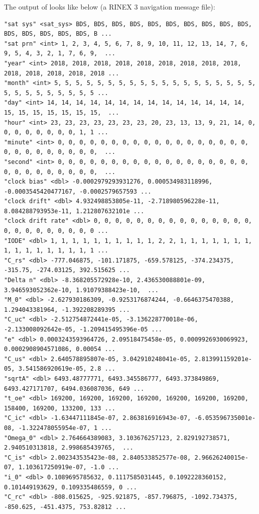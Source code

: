 \documentclass[9pt,a4paper,onecolumn,oneside]{rho-class/rho}
\begin{document}
The output of  looks like below (a RINEX 3 navigation message file):
\begin{verbatim}
"sat sys" <sat_sys> BDS, BDS, BDS, BDS, BDS, BDS, BDS, BDS, BDS, BDS, BDS, BDS, BDS, BDS, BDS, B ...
"sat prn" <int> 1, 2, 3, 4, 5, 6, 7, 8, 9, 10, 11, 12, 13, 14, 7, 6, 9, 5, 4, 3, 2, 1, 7, 6, 9,  ...
"year" <int> 2018, 2018, 2018, 2018, 2018, 2018, 2018, 2018, 2018, 2018, 2018, 2018, 2018, 2018 ...
"month" <int> 5, 5, 5, 5, 5, 5, 5, 5, 5, 5, 5, 5, 5, 5, 5, 5, 5, 5, 5, 5, 5, 5, 5, 5, 5, 5, 5, 5 ...
"day" <int> 14, 14, 14, 14, 14, 14, 14, 14, 14, 14, 14, 14, 14, 14, 15, 15, 15, 15, 15, 15, 15,  ...
"hour" <int> 23, 23, 23, 23, 23, 23, 23, 20, 23, 13, 13, 9, 21, 14, 0, 0, 0, 0, 0, 0, 0, 0, 1, 1 ...
"minute" <int> 0, 0, 0, 0, 0, 0, 0, 0, 0, 0, 0, 0, 0, 0, 0, 0, 0, 0, 0, 0, 0, 0, 0, 0, 0, 0, 0,  ...
"second" <int> 0, 0, 0, 0, 0, 0, 0, 0, 0, 0, 0, 0, 0, 0, 0, 0, 0, 0, 0, 0, 0, 0, 0, 0, 0, 0, 0,  ...
"clock bias" <dbl> -0.0002979293931276, 0.000534983118996, -0.0003545420477167, -0.0002579657593 ...
"clock drift" <dbl> 4.932498853805e-11, -2.718980596228e-11, 8.084288793953e-11, 1.212807632101e ...
"clock drift rate" <dbl> 0, 0, 0, 0, 0, 0, 0, 0, 0, 0, 0, 0, 0, 0, 0, 0, 0, 0, 0, 0, 0, 0, 0, 0 ...
"IODE" <dbl> 1, 1, 1, 1, 1, 1, 1, 1, 1, 1, 2, 2, 1, 1, 1, 1, 1, 1, 1, 1, 1, 1, 1, 1, 1, 1, 1, 1 ...
"C_rs" <dbl> -777.046875, -101.171875, -659.578125, -374.234375, -315.75, -274.03125, 392.515625 ...
"Delta n" <dbl> -8.368205572928e-10, 2.436530088801e-09, 3.946593052362e-10, 1.91079388423e-10,  ...
"M_0" <dbl> -2.627930186309, -0.9253176874244, -0.6646375470388, 1.294043381964, -1.392208289395 ...
"C_uc" <dbl> -2.512754872441e-05, -3.136228770018e-06, -2.133008092642e-05, -1.209415495396e-05 ...
"e" <dbl> 0.0003243593964726, 2.09518475458e-05, 0.0009926930069923, 0.0002908904571086, 0.00054 ...
"C_us" <dbl> 2.640578895807e-05, 3.042910248041e-05, 2.813991159201e-05, 3.541586920619e-05, 2.8 ...
"sqrtA" <dbl> 6493.48777771, 6493.345586777, 6493.373849869, 6493.427171707, 6494.036087036, 649 ...
"t_oe" <dbl> 169200, 169200, 169200, 169200, 169200, 169200, 169200, 158400, 169200, 133200, 133 ...
"C_ic" <dbl> -1.63447111845e-07, 2.863816916943e-07, -6.053596735001e-08, -1.322478055954e-07, 1 ...
"Omega_0" <dbl> 2.764664389083, 3.103676257123, 2.829192738571, 2.940510313818, 2.998685439765,  ...
"C_is" <dbl> 2.002343535423e-08, 2.840533852577e-08, 2.96626240015e-07, 1.103617250919e-07, -1.0 ...
"i_0" <dbl> 0.1089695785632, 0.1117585031445, 0.1092228360152, 0.101449193629, 0.109335486559, 0 ...
"C_rc" <dbl> -808.015625, -925.921875, -857.796875, -1092.734375, -850.625, -451.4375, 753.82812 ...

\end{verbatim}
\end{document}
